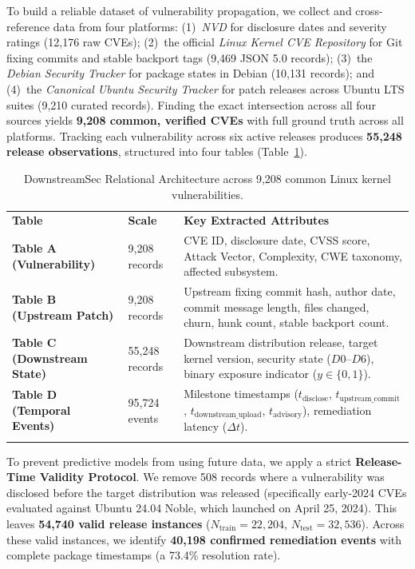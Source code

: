 \documentclass[graybox]{svmult}
\begin{document}
To build a reliable dataset of vulnerability propagation, we collect and cross-reference data from four platforms: (1)~\textit{NVD} for disclosure dates and severity ratings (12,176 raw CVEs); (2)~the official \textit{Linux Kernel CVE Repository} for Git fixing commits and stable backport tags (9,469 JSON 5.0 records); (3)~the \textit{Debian Security Tracker} for package states in Debian (10,131 records); and (4)~the \textit{Canonical Ubuntu Security Tracker} for patch releases across Ubuntu LTS suites (9,210 curated records). Finding the exact intersection across all four sources yields \textbf{9,208 common, verified CVEs} with full ground truth across all platforms. Tracking each vulnerability across six active releases produces \textbf{55,248 release observations}, structured into four tables (Table~\ref{tab:schema}).

\begin{table}[htbp]
\caption{DownstreamSec Relational Architecture across 9,208 common Linux kernel vulnerabilities.}
\label{tab:schema}
\centering
\scriptsize
\begin{tabular}{llp{6.8cm}}
\hline\noalign{\smallskip}
\textbf{Table} & \textbf{Scale} & \textbf{Key Extracted Attributes} \\
\noalign{\smallskip}\svhline\noalign{\smallskip}
\textbf{Table A (Vulnerability)} & 9,208 records & CVE ID, disclosure date, CVSS score, Attack Vector, Complexity, CWE taxonomy, affected subsystem. \\
\textbf{Table B (Upstream Patch)} & 9,208 records & Upstream fixing commit hash, author date, commit message length, files changed, churn, hunk count, stable backport count. \\
\textbf{Table C (Downstream State)} & 55,248 records & Downstream distribution release, target kernel version, security state ($D0$--$D6$), binary exposure indicator ($y \in \{0, 1\}$). \\
\textbf{Table D (Temporal Events)} & 95,724 events & Milestone timestamps ($t_{\text{disclose}}$, $t_{\text{upstream\_commit}}$, $t_{\text{downstream\_upload}}$, $t_{\text{advisory}}$), remediation latency ($\Delta t$). \\
\noalign{\smallskip}\hline
\end{tabular}
\end{table}

To prevent predictive models from using future data, we apply a strict \textbf{Release-Time Validity Protocol}. We remove 508 records where a vulnerability was disclosed before the target distribution was released (specifically early-2024 CVEs evaluated against Ubuntu 24.04 Noble, which launched on April 25, 2024). This leaves \textbf{54,740 valid release instances} ($N_{\text{train}} = 22,204$, $N_{\text{test}} = 32,536$). Across these valid instances, we identify \textbf{40,198 confirmed remediation events} with complete package timestamps (a 73.4\% resolution rate).
\end{document}

